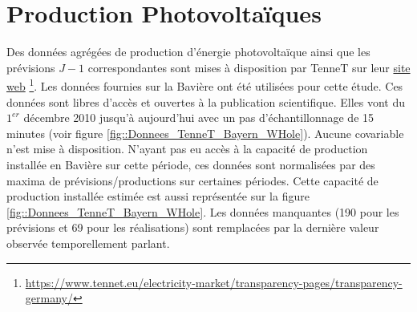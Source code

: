 \documentclass[12pt]{report}
\begin{document}
\section{Production Photovoltaïques}
Des données agrégées de production d'énergie photovoltaïque ainsi que les prévisions $J-1$ correspondantes sont mises à disposition par TenneT sur leur \href{https://www.tennet.eu/electricity-market/transparency-pages/transparency-germany/}{site web} \footnote{\url{https://www.tennet.eu/electricity-market/transparency-pages/transparency-germany/}}. Les données fournies sur la Bavière ont été utilisées pour cette étude. Ces données sont libres d'accès et ouvertes à la publication scientifique. Elles vont du $1^{er}$ décembre 2010 jusqu'à aujourd'hui avec un pas d'échantillonnage de 15 minutes (voir figure \ref{fig::Donnees_TenneT_Bayern_WHole}). Aucune covariable n'est mise à disposition. N'ayant pas eu accès à la capacité de production installée en Bavière sur cette période, ces données sont normalisées par des maxima de prévisions/productions sur certaines périodes. Cette capacité de production installée estimée est aussi représentée sur la figure \ref{fig::Donnees_TenneT_Bayern_WHole}. Les données manquantes (190 pour les prévisions et 69 pour les réalisations) sont remplacées par la dernière valeur observée temporellement parlant. 
\end{document}
